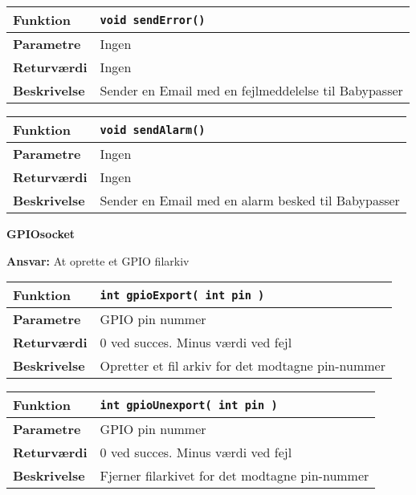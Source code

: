 \begin{center}
    \begin{tabular}{ | l | p{} |}
    \hline
    \textbf{Funktion}	& \verb+void sendError() +									\\ \hline
    \textbf{Parametre} 	& Ingen														\\ \hline
    \textbf{Returværdi}	& Ingen 														\\ \hline
    \textbf{Beskrivelse}	& Sender en Email med en fejlmeddelelse til Babypasser		\\ \hline
    \end{tabular}
\end{center}

\begin{center}
    \begin{tabular}{ | l | p{} |}
    \hline
    \textbf{Funktion}	& \verb+void sendAlarm() +									\\ \hline
    \textbf{Parametre} 	& Ingen														\\ \hline
    \textbf{Returværdi}	& Ingen 														\\ \hline
    \textbf{Beskrivelse}	& Sender en Email med en alarm besked til Babypasser		\\ \hline
    \end{tabular}
\end{center}

{\centering
\textbf{GPIOsocket}\par
}
\textbf{Ansvar:} At oprette et GPIO filarkiv \

\begin{center}
    \begin{tabular}{ | l | p{} |}
    \hline
    \textbf{Funktion}	& \verb+int gpioExport( int pin ) +					\\ \hline
    \textbf{Parametre} 	& GPIO pin nummer									\\ \hline
    \textbf{Returværdi}	& 0 ved succes. Minus værdi ved fejl					\\ \hline
    \textbf{Beskrivelse}	& Opretter et fil arkiv for det modtagne pin-nummer	\\ \hline
    \end{tabular}
\end{center}

\begin{center}
    \begin{tabular}{ | l | p{} |}
    \hline
    \textbf{Funktion}	& \verb+int gpioUnexport( int pin ) +			\\ \hline
    \textbf{Parametre} 	& GPIO pin nummer								\\ \hline
    \textbf{Returværdi}	& 0 ved succes. Minus værdi ved fejl				\\ \hline
    \textbf{Beskrivelse}	& Fjerner filarkivet for det modtagne pin-nummer	\\ \hline
    \end{tabular}
\end{center}

